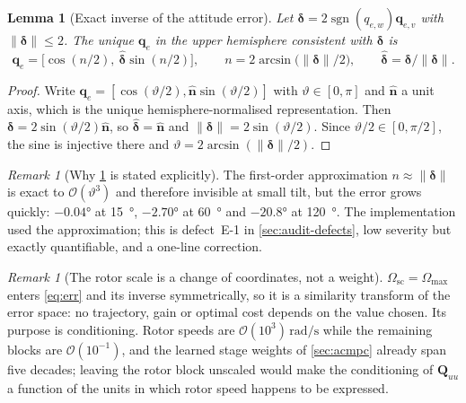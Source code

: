 \documentclass[11pt,a4paper,twoside,openright]{report}
\newcommand{\sgn}{\operatorname{sgn}}
\renewcommand{\vec}[1]{\bm{#1}}
\newcommand{\mat}[1]{\bm{#1}}
\newcommand{\quat}{\vec{q}}
\theoremstyle{plain}
\newtheorem{lemma}[theorem]{Lemma}
\theoremstyle{definition}
\theoremstyle{remark}
\newtheorem{remark}[theorem]{Remark}
\DeclareRobustCommand{\nbd}{\mbox{-}}
\begin{document}
	\begin{lemma}[Exact inverse of the attitude error]
		\label{lem:inverse}
		Let $\vec\delta=2\sgn(q_{e,w})\vec q_{e,v}$ with $\|\vec\delta\|\le2$. The unique
		$\quat_e$ in the upper hemisphere consistent with $\vec\delta$ is
		\begin{equation}
			\quat_e=\big[\cos(n/2),\ \hat{\vec\delta}\sin(n/2)\big],
			\qquad n = 2\arcsin\!\big(\|\vec\delta\|/2\big),
			\qquad \hat{\vec\delta}=\vec\delta/\|\vec\delta\|.
			\label{eq:einv}
		\end{equation}
	\end{lemma}

	\begin{proof}
		Write $\quat_e=[\cos(\vartheta/2),\hat{\vec n}\sin(\vartheta/2)]$ with
		$\vartheta\in[0,\pi]$ and $\hat{\vec n}$ a unit axis, which is the unique
		hemisphere-normalised representation. Then
		$\vec\delta=2\sin(\vartheta/2)\hat{\vec n}$, so
		$\hat{\vec\delta}=\hat{\vec n}$ and
		$\|\vec\delta\|=2\sin(\vartheta/2)$. Since $\vartheta/2\in[0,\pi/2]$, the sine
		is injective there and $\vartheta=2\arcsin(\|\vec\delta\|/2)$.
	\end{proof}

	\begin{remark}[Why \cref{lem:inverse} is stated explicitly]
		The first-order approximation $n\approx\|\vec\delta\|$ is exact to
		$\mathcal O(\vartheta^3)$ and therefore invisible at small tilt, but the error
		grows quickly: $\num{-0.04}\si{\degree}$ at \SI{15}{\degree},
		$\num{-2.70}\si{\degree}$ at \SI{60}{\degree} and $\num{-20.8}\si{\degree}$ at
		\SI{120}{\degree}. The implementation used the approximation; this is
		defect~E\nbd 1 in \cref{sec:audit-defects}, low severity but exactly
		quantifiable, and a one-line correction.
	\end{remark}

	\begin{remark}[The rotor scale is a change of coordinates, not a weight]
		\label{rem:omsc}
		$\Omega_\mathrm{sc}=\Omega_{\max}$ enters \cref{eq:err} and its inverse
		symmetrically, so it is a similarity transform of the error space: no
		trajectory, gain or optimal cost depends on the value chosen. Its purpose is
		conditioning. Rotor speeds are $\mathcal O(10^{3})\,\si{\radian\per\second}$
		while the remaining blocks are $\mathcal O(10^{-1})$, and the learned stage
		weights of \cref{sec:acmpc} already span five decades; leaving the rotor block
		unscaled would make the conditioning of $\mat Q_{uu}$ a function of the units
		in which rotor speed happens to be expressed.
	\end{remark}
\end{document}
